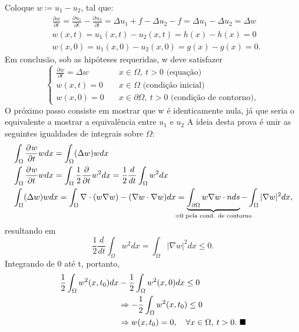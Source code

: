 \documentclass[../pde_notes.tex]{subfiles}
\begin{document}
\begin{proof*}
	Coloque \(w\coloneqq u_{1}-u_{2}\), tal que:
	\begin{align*}
		 & \frac{\partial^{}w}{\partial t^{}} = \frac{\partial^{}u_{1}}{\partial t^{}} - \frac{\partial^{}u_{2}}{\partial t^{}} = \Delta u_{1} + f - \Delta u_{2} - f = \Delta u_{1} - \Delta u_{2} = \Delta w \\
		 & w(x, t) = u_{1}(x, t) - u_{2}(x, t) = h(x) - h(x) = 0                                                                                                                                               \\
		 & w(x, 0) = u_{1}(x, 0) - u_{2}(x, 0) = g(x) - g(x) = 0.
	\end{align*}
	Em conclusão, sob as hipóteses requeridas, w deve satisfazer
	\[
		\left\{\begin{array}{ll}
			\frac{\partial^{}w}{\partial t^{}} = \Delta w & \quad x\in \Omega ,\: t > 0\text{ (equação)}                       \\
			w(x, t) = 0                                   & \quad x\in \Omega\text{ (condição inicial)}                        \\
			w(x, 0) = 0                                   & \quad x\in \partial\Omega,\: t > 0\text{ (condição de contorno)} ,
		\end{array}\right.
	\]
	O próximo passo consiste em mostrar que w é identicamente nula, já que seria o equivalente a mostrar a equivalência entre \(u_{1}\) e \(u_{2}\)
	A ideia desta prova é unir as seguintes igualdades de integrais sobre \(\Omega \):
	\begin{align*}
		 & \int_{\Omega }^{}\frac{\partial^{}w}{\partial t^{}}wdx = \int_{\Omega }^{}(\Delta w)wdx                                                                                                                                                                    \\
		 & \int_{\Omega }^{}\frac{\partial^{}w}{\partial t^{}}w dx = \int_{\Omega }^{}\frac{1}{2}\frac{\partial^{}}{\partial t^{}}w^{2} dx = \frac{1}{2}\frac{d}{dt}\int_{\Omega }^{}w^{2}dx                                                                          \\
		 & \int_{\Omega }^{}(\Delta w)w dx = \int_{\Omega }^{}\nabla \cdot (w\nabla w) - (\nabla w \cdot \nabla w)dx = \underbrace{\int_{\partial \Omega }^{}w\nabla w \cdot n ds}_{\mathclap{=0\text{ pela cond. de contorno}}} - \int_{\Omega }^{}|\nabla w|^{2}dx,
	\end{align*}
	resultando em
	\[
		\frac{1}{2} \frac{d}{dt}\int_{\Omega }^{}w^{2}dx = \int_{\Omega }^{}|\nabla w|^{2}dx \leq 0.
	\]
	Integrando de 0 até t, portanto,
	\begin{align*}
		\frac{1}{2}\int_{\Omega }^{}w^{2}(x, t_{0})dx & - \frac{1}{2}\int_{\Omega }^{}w^{2}(x, 0)dx \leq 0                               \\
		                                              & \Rightarrow -\frac{1}{2}\int_{\Omega }^{}w^{2}(x, t_{0})\leq 0                   \\
		                                              & \Rightarrow w(x, t_{0}) = 0,\quad \forall x\in \Omega ,\: t>0.\text{ $\blacksquare$}
	\end{align*}
\end{proof*}
\end{document}
